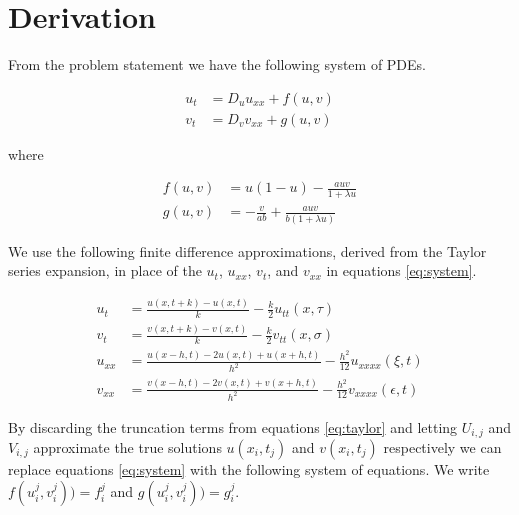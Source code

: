 \section{Derivation}

From the problem statement we have the following system of PDEs.

\begin{subequations} \label{eq:system}
\begin{align}
    u_t &= D_u u_{xx} + f(u,v) \label{eq:prey} \\
    v_t &= D_v v_{xx} + g(u,v) \label{eq:pred}
\end{align}
\end{subequations}

where

\begin{subequations}
\begin{align*}
    f(u,v) &= u(1-u) - \frac{auv}{1+\lambda u} \\
    g(u,v) &= - \frac{v}{ab} + \frac{auv}{b(1+\lambda u)}
\end{align*}
\end{subequations}

We use the following finite difference approximations, derived from the
Taylor series expansion, in place of the $u_t$, $u_{xx}$, $v_t$, and
$v_{xx}$ in equations \eqref{eq:system}.

\begin{subequations} \label{eq:taylor}
\begin{align}
    u_t &= \frac{u(x,t+k)-u(x,t)}{k} - \frac{k}{2} u_{tt}(x,\tau) \label{eq:u_t} \\
    v_t &= \frac{v(x,t+k)-v(x,t)}{k} - \frac{k}{2} v_{tt}(x,\sigma) \label{eq:v_t}
    \\
    u_{xx} &= \frac{u(x-h,t)-2u(x,t)+u(x+h,t)}{h^2} - \frac{h^2}{12} u_{xxxx}(\xi,t) \label{eq:u_xx} \\
    v_{xx} &= \frac{v(x-h,t)-2v(x,t)+v(x+h,t)}{h^2} - \frac{h^2}{12} v_{xxxx}(\epsilon,t) \label{eq:v_xx}
\end{align}
\end{subequations}

By discarding the truncation terms from equations \eqref{eq:taylor} and letting
$U_{i,j}$ and $V_{i,j}$ approximate the true solutions $u(x_i,t_j)$ and
$v(x_i,t_j)$ respectively we can replace equations \eqref{eq:system} with the
following system of equations. We write $f(u_i^j,v_i^j)) = f_i^j$ and
$g(u_i^j,v_i^j)) = g_i^j$.

